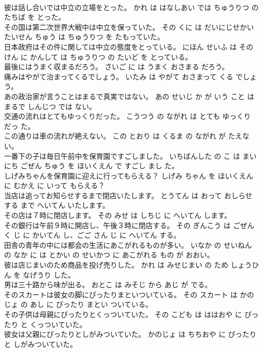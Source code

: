 \documentclass[8pt]{extreport}
\begin{document}
\begin{CJK}{UTF8}{min}
\\	彼は話し合いでは中立の立場をとった。	かれ は はなしあい では ちゅうりつ の たちば を とった。	
\\	その国は第二次世界大戦中は中立を保っていた。	その くに は だいにじせかいたいせん ちゅう は ちゅうりつ を たもっていた。	
\\	日本政府はその件に関しては中立の態度をとっている。	にほん せいふ は その けん に かんして は ちゅうりつ の たいど を とっている。	
\\	最後にはうまく収まるだろう。	さいご に は うまく おさまる だろう。	
\\	痛みはやがて治まってくるでしょう。	いたみ は やがて おさまって くる でしょう。	
\\	あの政治家が言うことはまるで真実ではない。	あの せいじ か が いう こと は まるで しんじつ では ない。	
\\	交通の流れはとてもゆっくりだった。	こうつう の ながれ は とても ゆっくり だっ た。	
\\	この通りは車の流れが絶えない。	この とおり は くるま の ながれ が たえない。	
\\	一番下の子は毎日午前中を保育園ですごしました。	いちばんした の こ は まいにち ごぜん ちゅう を ほいくえん で すごし まし た。	
\\	しげみちゃんを保育園に迎えに行ってもらえる？	しげみ ちゃん を ほいくえん に むかえ に いって もらえる？	
\\	当店は追ってお知らせするまで閉店いたします。	とうてん は おって おしらせ する まで へいてん いたします。	
\\	その店は７時に閉店します。	その みせ は しちじ に へいてん します。	
\\	その銀行は午前９時に開店し、午後３時に閉店する。	その ぎんこう は ごぜん く じ に かいてん し、ごご さん じ に へいてん する。	
\\	田舎の青年の中には都会の生活にあこがれるものが多い。	いなか の せいねん の なか に は とかい の せいかつ に あこがれる もの が おおい。	
\\	彼は店じまいのため商品を投げ売りした。	かれ は みせじまい の ため しょうひん を なげうり した。	
\\	男は三十路から味が出る。	おとこ は みそじ から あじ が でる。	
\\	そのスカートは彼女の脚にぴったりまといついている。	その スカート は かのじょ の あし に ぴったり まとい ついている。	
\\	その子供は母親にぴったりとくっついていた。	その こども は ははおや に ぴったり と くっついていた。	
\\	彼女は父親にぴったりとしがみついていた。	かのじょ は ちちおや に ぴったり と しがみついていた。	

\end{CJK}
\end{document}
